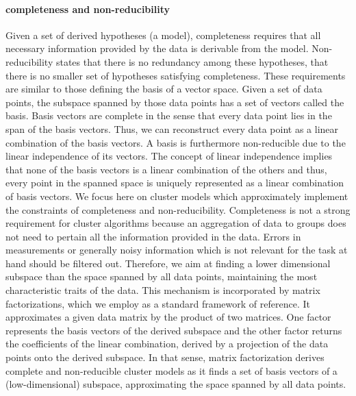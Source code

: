 \paragraph{completeness and non-reducibility} Given a set of derived hypotheses (a model), completeness requires that all necessary information provided by the data is derivable from the model. Non-reducibility states that there is no redundancy among these hypotheses, that there is no smaller set of hypotheses satisfying completeness. These requirements are similar to those defining the basis of a vector space. Given a set of data points, the subspace spanned by those data points has a set of vectors called the basis. Basis vectors are complete in the sense that every data point lies in the span of the basis vectors. Thus, we can reconstruct every data point as a linear combination of the basis vectors. A basis is furthermore non-reducible due to the linear independence of its vectors. The concept of linear independence implies that none of the basis vectors is a linear combination of the others and thus, every point in the spanned space is uniquely represented as a linear combination of basis vectors. 
We focus here on cluster models which approximately implement the constraints of completeness and non-reducibility.  Completeness is not a strong requirement for cluster algorithms because an aggregation of data to groups does not need to pertain all the information provided in the data. Errors in measurements or generally noisy information which is not relevant for the task at hand should be filtered out. Therefore, we aim at finding a lower dimensional subspace than the space spanned by all data points, maintaining the most characteristic traits of the data. This mechanism is incorporated by matrix factorizations, which we employ as a standard framework of reference. It approximates a given data matrix by the product of two matrices. One factor represents the basis vectors of the derived subspace and the other factor returns the coefficients of the linear combination, derived by a projection of the data points onto the derived subspace. In that sense, matrix factorization derives complete and non-reducible cluster models as it finds a set of basis vectors of a (low-dimensional) subspace, approximating the space spanned by all data points.

